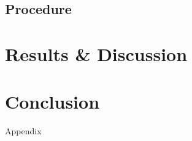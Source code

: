 \subsection{Procedure}


\section{Results \& Discussion}

\section{Conclusion}

\begin{thebibliography}{99}
\end{thebibliography}

\newpage \LARGE{Appendix}

  
